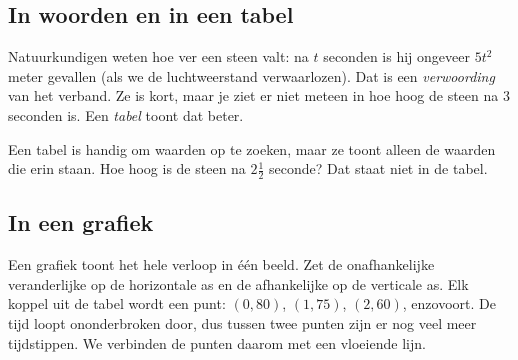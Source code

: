\subsection{In woorden en in een tabel}

Natuurkundigen weten hoe ver een steen valt: na $t$ seconden is hij ongeveer $5t^2$ meter gevallen (als we de luchtweerstand verwaarlozen). Dat is een \textit{verwoording} van het verband. Ze is kort, maar je ziet er niet meteen in hoe hoog de steen na 3 seconden is. Een \textit{tabel} toont dat beter.


Een tabel is handig om waarden op te zoeken, maar ze toont alleen de waarden die erin staan. Hoe hoog is de steen na $2\tfrac12$ seconde? Dat staat niet in de tabel.

\subsection{In een grafiek}

Een grafiek toont het hele verloop in één beeld. Zet de onafhankelijke veranderlijke op de horizontale as en de afhankelijke op de verticale as. Elk koppel uit de tabel wordt een punt: $(0, 80)$, $(1, 75)$, $(2, 60)$, enzovoort. De tijd loopt ononderbroken door, dus tussen twee punten zijn er nog veel meer tijdstippen. We verbinden de punten daarom met een vloeiende lijn.

